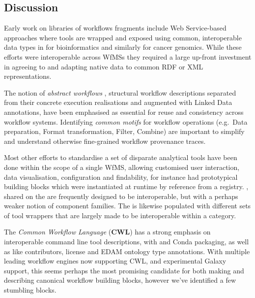 \subsection{Discussion}\label{ch6:discussion}

Early work on libraries of workflows fragments include Web Service-based approaches where tools are wrapped and exposed using common, interoperable data types in  \cite{ch6-27} for bioinformatics and similarly  \cite{ch6-28} for cancer genomics.
While these efforts were interoperable across WfMSs they required a large up-front investment in agreeing to and adapting native data to common RDF or XML representations.

The notion of \emph{abstract workflows} \cite{Garijo 2011}, structural workflow descriptions separated from their concrete execution realisations and augmented with Linked Data annotations, have been emphasised as essential for reuse and consistency across workflow systems.
Identifying \emph{common motifs} for workflow operations \cite{ch6-30} (e.g.~Data preparation, Format transformation, Filter, Combine) are important to simplify and understand otherwise fine-grained workflow provenance traces.

Most other efforts to standardise a set of disparate analytical tools have been done within the scope of a single WfMS, allowing customised user interaction, data visualisation, configuration and findability, for instance  had prototypical building blocks \cite{ch6-31} which were instantiated at runtime by reference from a registry. 
, shared on the  are frequently designed to be interoperable, but with a perhaps weaker notion of component families.
The  \cite{ch6-32} is likewise populated with different sets of tool wrappers that are largely made to be interoperable within a category.

The \emph{Common Workflow Language} (\textbf{CWL}) \cite{Crusoe 2022} has a strong emphasis on interoperable command line tool descriptions, with  and Conda packaging, as well as  like contributors, license and EDAM ontology type annotations.
With multiple leading workflow engines now supporting CWL, and experimental Galaxy support, this seems perhaps the most promising candidate for both making and describing canonical workflow building blocks, however we've identified a few stumbling blocks.

